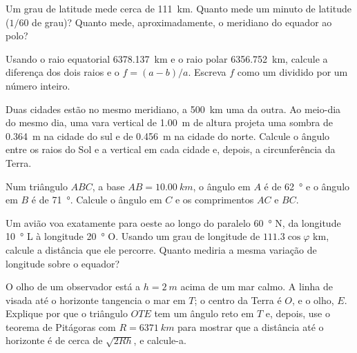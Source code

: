 \begin{exercise}[$\star$]\label{exo:g10:measuring-the-earth:4}
Um grau de latitude mede cerca de \qty{111}{km}. Quanto mede um minuto de
latitude ($1/60$ de grau)? Quanto mede, aproximadamente, o meridiano do
equador ao polo?
\end{exercise}

\begin{exercise}[$\star$]\label{exo:g10:measuring-the-earth:5}
Usando o raio equatorial \qty{6378.137}{km} e o raio polar
\qty{6356.752}{km}, calcule a diferença dos dois raios e o 
$f = (a-b)/a$. Escreva $f$ como um dividido por um número inteiro.
\end{exercise}

\begin{exercise}[$\star\star$]\label{exo:g10:measuring-the-earth:6}
Duas cidades estão no mesmo meridiano, a \qty{500}{km} uma da outra. Ao
meio-dia do mesmo dia, uma vara vertical de \qty{1.00}{m} de altura projeta
uma sombra de \qty{0.364}{m} na cidade do sul e de \qty{0.456}{m} na
cidade do norte. Calcule o ângulo entre os raios do Sol e a vertical em
cada cidade e, depois, a circunferência da Terra.
\end{exercise}

\begin{exercise}[$\star\star$]\label{exo:g10:measuring-the-earth:7}
Num triângulo $ABC$, a base $AB = \qty{10.00}{km}$, o ângulo em $A$ é de
\qty{62}{\degree} e o ângulo em $B$ é de \qty{71}{\degree}. Calcule o
ângulo em $C$ e os comprimentos $AC$ e $BC$.
\end{exercise}

\begin{exercise}[$\star\star$]\label{exo:g10:measuring-the-earth:8}
Um avião voa exatamente para oeste ao longo do paralelo \qty{60}{\degree} N,
da longitude \qty{10}{\degree} L à longitude \qty{20}{\degree} O. Usando um
grau de longitude de $111.3 \cos \varphi$ km, calcule a distância que ele
percorre. Quanto mediria a mesma variação de longitude sobre o equador?
\end{exercise}

\begin{exercise}[$\star\star$]\label{exo:g10:measuring-the-earth:9}
O olho de um observador está a $h = \qty{2}{m}$ acima de um mar calmo. A
linha de visada até o horizonte tangencia o mar em $T$; o centro da Terra é
$O$, e o olho, $E$. Explique por que o triângulo $OTE$ tem um ângulo reto
em $T$ e, depois, use o teorema de Pitágoras com $R = \qty{6371}{km}$ para
mostrar que a distância até o horizonte é de cerca de $\sqrt{2Rh}$, e
calcule-a.
\end{exercise}

